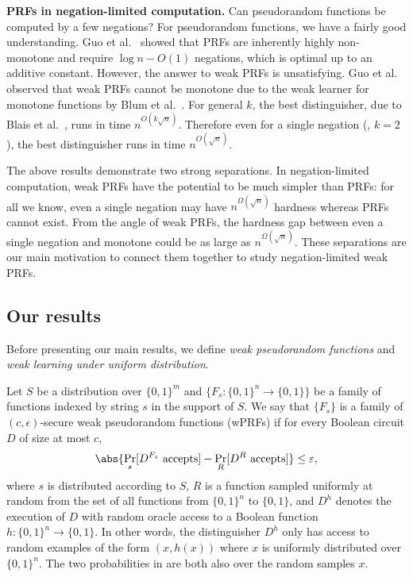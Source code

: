 \documentclass{toc}
\newcommand{\warn}[1]{#1}
\begin{document}
\vspace{2ex}
%
\noindent\textbf{PRFs in negation-limited computation.} %
Can pseudorandom functions be computed by a few negations? For pseudorandom functions, we have a fairly good understanding. Guo et al.~\cite{GMOR15} showed that PRFs are inherently highly non-monotone and require $\log{n}-O(1)$ negations, which is optimal up to an additive constant. However, the answer to weak PRFs is unsatisfying. Guo et al.~\cite{GMOR15} observed that weak PRFs cannot be monotone due to the weak learner for monotone functions by Blum et al.~\cite{BABL98}. For general $k$, the best distinguisher, due to Blais et al.~\cite{BCOST15}, runs in time $n^{O(k\sqrt{n})}$.  Therefore even for a single negation (\ie, $k=2$), the best distinguisher runs in time $n^{O(\sqrt{n})}$.

The above results demonstrate two strong separations. In negation-limited computation,
weak PRFs have the potential to be much simpler than PRFs: 
for all we know, %
even a single negation
may have %
%
%
%
%
$n^{\Omega(\sqrt{n})}$ %
hardness whereas PRFs cannot exist. From the angle of weak PRFs, the hardness gap between even a single negation and monotone 
%
could %
be %
as large as 
%
$n^{\Omega(\sqrt{n})}$.  %
%
These separations are our main motivation to connect them together to study negation-limited weak PRFs. 

\subsection{Our results}
Before presenting our main results, we define \emph{weak pseudorandom functions} and \emph{weak learning under uniform distribution}.
%
%
\begin{definition}\label{def:wprfs}
Let $S$ be a distribution over $\{0,1\}^m$ and $\{F_s:\{0,1\}^n\rightarrow\{0,1\}\}$ be a family of functions indexed by string $s$ in the support of $S$. We say
that  %
$\{F_s\}$ is a
family of %
$(c,\epsilon)$-secure weak pseudorandom functions (wPRFs) if for every
%
%
%
Boolean circuit $D$  %
of size at most $c$,
\begin{align}\label{ineq:def1}
\abs{\Pr_s[D^{F_s}\mbox{ accepts}]-\Pr_R[D^R\mbox{ accepts}]}\leq \varepsilon,
\end{align}
where $s$ is distributed according to $S$, $R$ is a function sampled uniformly at random from the set of all functions from $\{0,1\}^n$ to $\{0,1\}$, and $D^h$ denotes the execution of $D$ with random oracle access to a Boolean function $h:\{0,1\}^n\rightarrow\{0,1\}$. In other words, the distinguisher $D^h$ only has access to random examples of the form $(x,h(x))$ where $x$ is uniformly distributed over $\{0,1\}^n$. \warn{The two probabilities in  are both also over the
%
random samples $x$.}  %
\end{definition}
\end{document}
